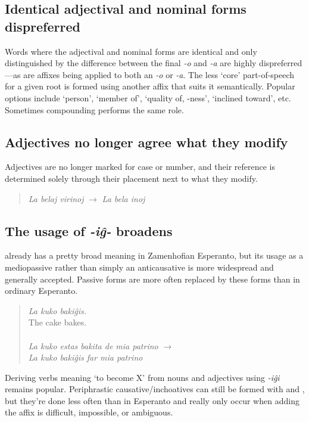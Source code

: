 \subsection{Identical adjectival and nominal forms dispreferred}

Words where the adjectival and nominal forms are identical and only distinguished by the difference between the final \textit{-o} and \textit{-a} are highly dispreferred---as are affixes being applied to both an \textit{-o} or \textit{-a}. The less `core' part-of-speech for a given root is formed using another affix that suits it semantically. Popular options include  `person',  `member of',  `quality of, -ness',  `inclined toward', etc. Sometimes compounding performs the same role.

\subsection{Adjectives no longer agree what they modify}

Adjectives are no longer marked for case or number, and their reference is determined solely through their placement next to what they modify.
\begin{quote}
    \textit{La belaj virinoj} $\to$ \textit{La bela inoj}
\end{quote}

\subsection{The usage of \textit{-iĝ-} broadens}

 already has a pretty broad meaning in Zamenhofian Esperanto, but its usage as a mediopassive rather than simply an anticausative is more widespread and generally accepted. Passive forms are more often replaced by these forms than in ordinary Esperanto.
\begin{quote}
    \textit{La kuko bakiĝis.}\\
    The cake bakes.\\
    \\
    \textit{La kuko estas bakita de mia patrino} $\to$\\
    \textit{La kuko bakiĝis far mia patrino}
\end{quote}

Deriving verbs meaning `to become X' from nouns and adjectives using \textit{-iĝi} remains popular. Periphrastic causative/inchoatives can still be formed with  and , but they're done less often than in Esperanto and really only occur when adding the affix is difficult, impossible, or ambiguous.

